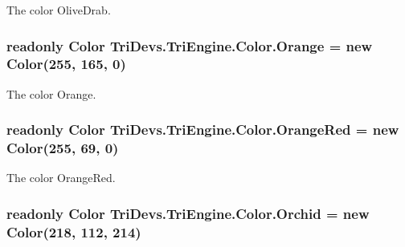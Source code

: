 The color Olive\-Drab. 

\hypertarget{struct_tri_devs_1_1_tri_engine_1_1_color_a75c9a43eb0d61e001bc6c5feba551bf5}{
\subsubsection[{Orange}]{\setlength{\rightskip}{0pt plus 5cm}readonly {\bf Color} Tri\-Devs.\-Tri\-Engine.\-Color.\-Orange = new {\bf Color}(255, 165, 0)\hspace{0.3cm}{\ttfamily [static]}}}\label{struct_tri_devs_1_1_tri_engine_1_1_color_a75c9a43eb0d61e001bc6c5feba551bf5}


The color Orange. 

\hypertarget{struct_tri_devs_1_1_tri_engine_1_1_color_a9fd0642af05fc928adb65c3f1e89ef55}{
\subsubsection[{Orange\-Red}]{\setlength{\rightskip}{0pt plus 5cm}readonly {\bf Color} Tri\-Devs.\-Tri\-Engine.\-Color.\-Orange\-Red = new {\bf Color}(255, 69, 0)\hspace{0.3cm}{\ttfamily [static]}}}\label{struct_tri_devs_1_1_tri_engine_1_1_color_a9fd0642af05fc928adb65c3f1e89ef55}


The color Orange\-Red. 

\hypertarget{struct_tri_devs_1_1_tri_engine_1_1_color_a4a38d414ebf3e2f37e2506561a2e2822}{
\subsubsection[{Orchid}]{\setlength{\rightskip}{0pt plus 5cm}readonly {\bf Color} Tri\-Devs.\-Tri\-Engine.\-Color.\-Orchid = new {\bf Color}(218, 112, 214)\hspace{0.3cm}{\ttfamily [static]}}}\label{struct_tri_devs_1_1_tri_engine_1_1_color_a4a38d414ebf3e2f37e2506561a2e2822}


